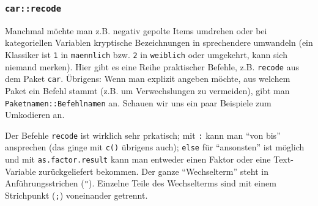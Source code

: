 \documentclass[12pt,]{book}
\newenvironment{Shaded}{\begin{snugshade}}{\end{snugshade}}
\newcommand{\KeywordTok}[1]{\textcolor[rgb]{0.13,0.29,0.53}{\textbf{{#1}}}}
\newcommand{\DataTypeTok}[1]{\textcolor[rgb]{0.13,0.29,0.53}{{#1}}}
\newcommand{\StringTok}[1]{\textcolor[rgb]{0.31,0.60,0.02}{{#1}}}
\newcommand{\CommentTok}[1]{\textcolor[rgb]{0.56,0.35,0.01}{\textit{{#1}}}}
\newcommand{\OtherTok}[1]{\textcolor[rgb]{0.56,0.35,0.01}{{#1}}}
\newcommand{\NormalTok}[1]{{#1}}
\begin{document}
\subsubsection{\texorpdfstring{\texttt{car::recode}}{car::recode}}\label{carrecode}

Manchmal möchte man z.B. negativ gepolte Items umdrehen oder bei
kategoriellen Variablen kryptische Bezeichnungen in sprechendere
umwandeln (ein Klassiker ist \texttt{1} in \texttt{maennlich} bzw.
\texttt{2} in \texttt{weiblich} oder umgekehrt, kann sich niemand
merken). Hier gibt es eine Reihe praktischer Befehle, z.B.
\texttt{recode} aus dem Paket \texttt{car}. Übrigens: Wenn man explizit
angeben möchte, aus welchem Paket ein Befehl stammt (z.B. um
Verwechslungen zu vermeiden), gibt man \texttt{Paketnamen::Befehlnamen}
an. Schauen wir uns ein paar Beispiele zum Umkodieren an.

\begin{Shaded}
\end{Shaded}

Der Befehle \texttt{recode} ist wirklich sehr prkatisch; mit \texttt{:}
kann man ``von bis'' ansprechen (das ginge mit \texttt{c()} übrigens
auch); \texttt{else} für ``ansonsten'' ist möglich und mit
\texttt{as.factor.result} kann man entweder einen Faktor oder eine
Text-Variable zurückgeliefert bekommen. Der ganze ``Wechselterm'' steht
in Anführungsstrichen (\texttt{"}). Einzelne Teile des Wechselterms sind
mit einem Strichpunkt (\texttt{;}) voneinander getrennt.
\end{document}
